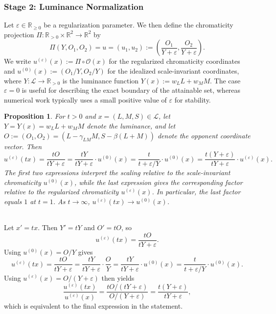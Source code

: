 \documentclass[11pt]{article}
\makeatletter
\theoremstyle{plain}
\newtheorem{proposition}[theorem]{Proposition}
\theoremstyle{definition}
\theoremstyle{remark}
\renewenvironment{proof}[1][\proofname]{\par\pushQED{\qed}\normalfont
\topsep6\p@\@plus6\p@\relax
\trivlist\item[\hskip\labelsep\bfseries #1\@addpunct{.}]\mbox{}\\\ignorespaces}{\popQED\endtrivlist\@endpefalse}
\newcommand{\R}{\mathbb{R}}
\newcommand{\Rnn}{\mathbb{R}_{\geq 0}}  %
\newcommand{\Rpp}{\mathbb{R}_{> 0}}     %
\makeatother
\begin{document}
\subsubsection{Stage 2: Luminance Normalization}

Let $\varepsilon \in \Rnn$ be a regularization parameter. We then define the chromaticity projection $\Pi: \Rpp \times \R^2 \to \R^2$ by
\begin{equation}
\boxed{
\Pi(Y, O_1, O_2) = u = (u_1, u_2) := \left( \frac{O_1}{Y + \varepsilon}, \frac{O_2}{Y + \varepsilon} \right).
}
\end{equation}
We write $u^{(\varepsilon)}(x) := \Pi \circ \mathcal{O}(x)$ for the regularized chromaticity coordinates and $u^{(0)}(x) := (O_1/Y, O_2/Y)$ for the idealized scale-invariant coordinates, where $Y: \mathcal{L} \to \Rpp$ is the luminance function $Y(x) := w_L L + w_M M$. The case $\varepsilon = 0$ is useful for describing the exact boundary of the attainable set, whereas numerical work typically uses a small positive value of $\varepsilon$ for stability.

\begin{proposition}
\label{prop:scale-invariance}
For $t > 0$ and $x = (L, M, S) \in \mathcal{L}$, let $Y = Y(x) = w_L L + w_M M$ denote the luminance, and let $O := (O_1, O_2) = (L - \gamma_{LM} M, S - \beta(L+M))$ denote the opponent coordinate vector.
Then
\begin{equation}
u^{(\varepsilon)}(tx)
= \frac{tO}{tY + \varepsilon}
= \frac{tY}{tY + \varepsilon} \cdot u^{(0)}(x)
= \frac{t}{t + \varepsilon/Y} \cdot u^{(0)}(x)
= \frac{t(Y + \varepsilon)}{tY + \varepsilon} \cdot u^{(\varepsilon)}(x).
\end{equation}
The first two expressions interpret the scaling relative to the scale-invariant chromaticity $u^{(0)}(x)$, while the last expression gives the corresponding factor relative to the regularized chromaticity $u^{(\varepsilon)}(x)$. In particular, the last factor equals $1$ at $t = 1$. As $t \to \infty$, $u^{(\varepsilon)}(tx) \to u^{(0)}(x)$.
\end{proposition}

\begin{proof}
\noindent Let $x' = tx$. Then $Y' = tY$ and $O' = tO$, so
\[
 u^{(\varepsilon)}(tx) = \frac{tO}{tY + \varepsilon}.
\]
Using $u^{(0)}(x) = O/Y$ gives
\[
u^{(\varepsilon)}(tx)
= \frac{tO}{tY + \varepsilon}
= \frac{tY}{tY + \varepsilon}\cdot \frac{O}{Y}
= \frac{tY}{tY + \varepsilon}\cdot u^{(0)}(x)
= \frac{t}{t + \varepsilon/Y}\cdot u^{(0)}(x).
\]
Using $u^{(\varepsilon)}(x) = O/(Y + \varepsilon)$ then yields
\[
\frac{u^{(\varepsilon)}(tx)}{u^{(\varepsilon)}(x)}
= \frac{tO/(tY + \varepsilon)}{O/(Y + \varepsilon)}
= \frac{t(Y + \varepsilon)}{tY + \varepsilon},
\]
which is equivalent to the final expression in the statement.
\end{proof}
\end{document}
